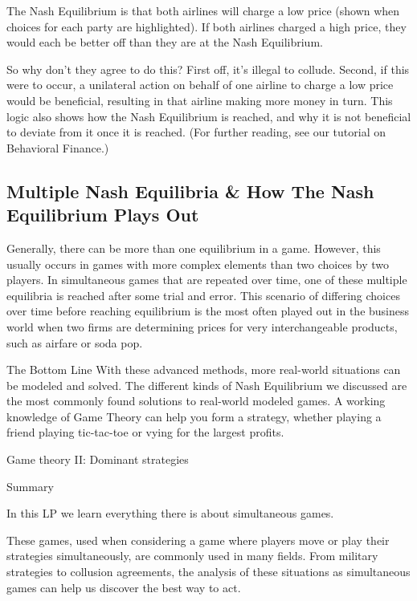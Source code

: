 The Nash Equilibrium is that both airlines will charge a low price (shown when choices for each party are highlighted). If both airlines charged a high price, they would each be better off than they are at the Nash Equilibrium.

So why don't they agree to do this? First off, it's illegal to collude. Second, if this were to occur, a unilateral action on behalf of one airline to charge a low price would be beneficial, resulting in that airline making more money in turn. This logic also shows how the Nash Equilibrium is reached, and why it is not beneficial to deviate from it once it is reached. (For further reading, see our tutorial on Behavioral Finance.)

\subsection{Multiple Nash Equilibria & How The Nash Equilibrium Plays Out}
Generally, there can be more than one equilibrium in a game. However, this usually occurs in games with more complex elements than two choices by two players. In simultaneous games that are repeated over time, one of these multiple equilibria is reached after some trial and error. This scenario of differing choices over time before reaching equilibrium is the most often played out in the business world when two firms are determining prices for very interchangeable products, such as airfare or soda pop.

The Bottom Line
With these advanced methods, more real-world situations can be modeled and solved. The different kinds of Nash Equilibrium we discussed are the most commonly found solutions to real-world modeled games. A working knowledge of Game Theory can help you form a strategy, whether playing a friend playing tic-tac-toe or vying for the largest profits.



Game theory II: Dominant strategies

Summary

In this LP we learn everything there is about simultaneous games. 

These games, used when considering a game where players move or play their strategies simultaneously, are commonly used in many fields. From military strategies to collusion agreements, the analysis of these situations as simultaneous games can help us discover the best way to act.

